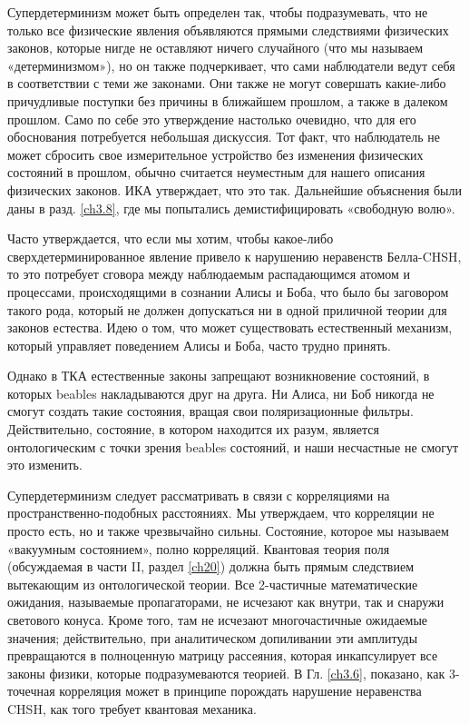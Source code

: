 \documentclass[main.tex]{subfiles}
\begin{document}
Супердетерминизм может быть определен так, чтобы подразумевать, что не только все физические явления объявляются прямыми следствиями физических законов, которые нигде не оставляют ничего случайного (что мы называем «детерминизмом»), но он также подчеркивает, что сами наблюдатели ведут себя в соответствии с теми же законами. Они также не могут совершать какие-либо причудливые поступки без причины в ближайшем прошлом, а также в далеком прошлом. Само по себе это утверждение настолько очевидно, что для его обоснования потребуется небольшая дискуссия. Тот факт, что наблюдатель не может сбросить свое измерительное устройство без изменения физических состояний в прошлом, обычно считается неуместным для нашего описания физических законов. ИКА утверждает, что это так. Дальнейшие объяснения были даны в разд. \ref{ch3.8}, где мы попытались демистифицировать «свободную волю».

Часто утверждается, что если мы хотим, чтобы какое-либо сверхдетерминированное явление привело к нарушению неравенств Белла-CHSH, то это потребует сговора между наблюдаемым распадающимся атомом и процессами, происходящими в сознании Алисы и Боба, что было бы заговором такого рода, который не должен допускаться ни в одной приличной теории для законов естества. Идею о том, что может существовать естественный механизм, который управляет поведением Алисы и Боба, часто трудно принять.

Однако в ТКА естественные законы запрещают возникновение состояний, в которых beables накладываются друг на друга. Ни Алиса, ни Боб никогда не смогут создать такие состояния, вращая свои поляризационные фильтры. Действительно, состояние, в котором находится их разум, является онтологическим с точки зрения beables состояний, и наши несчастные не смогут это изменить.

Супердетерминизм следует рассматривать в связи с корреляциями на пространственно-подобных расстояниях. Мы утверждаем, что корреляции не просто есть, но и также чрезвычайно сильны. Состояние, которое мы называем «вакуумным состоянием», полно корреляций. Квантовая теория поля (обсуждаемая в части II, раздел \ref{ch20}) должна быть прямым следствием вытекающим из онтологической теории. Все 2-частичные математические ожидания, называемые пропагаторами, не исчезают как внутри, так и снаружи светового конуса. Кроме того, там не исчезают многочастичные ожидаемые значения; действительно, при аналитическом допиливании эти амплитуды превращаются в полноценную матрицу рассеяния, которая инкапсулирует все законы физики, которые подразумеваются теорией. В Гл. \ref{ch3.6}, показано, как 3-точечная корреляция может в принципе порождать нарушение неравенства CHSH, как того требует квантовая механика. 
\end{document}
